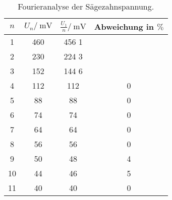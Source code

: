 \begin{table}
	\centering
	\begin{tabular}{S[table-format=2.0] S[table-format=3.0] S[table-format=3.1] S[table-format=1.0] }
	\toprule
	{$n$} & {$U_n/\:\si{\milli\volt}$} & {$\frac{U_1}{n}/\:\si{\milli\volt}$} & {Abweichung in $\%$}\\
	 & 460 & 456   1\\
 2 & 230 & 224   3\\
 3 & 152 & 144   6\\
 4 & 112 & 112 & 0\\
 5 &  88 &  88 & 0\\
 6 &  74 &  74 & 0\\
 7 &  64 &  64 & 0\\
 8 &  56 &  56 & 0\\
 9 &  50 &  48 & 4\\
10 &  44 &  46 & 5\\
11 &  40 &  40 & 0\\
	\bottomrule
	\end{tabular}
	\caption{Fourieranalyse der Sägezahnspannung.}
	\label{tab:FA_RE}
\end{table}


